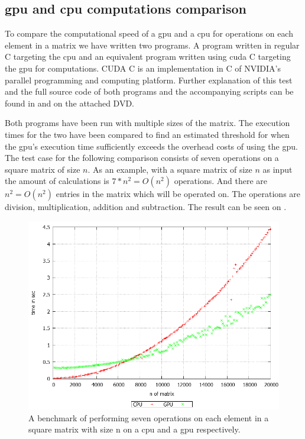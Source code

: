 \subsection{\acrshort{gpu} and \acrshort{cpu} computations comparison}\label{sub:gpubenchmark}
To compare the computational speed of a \acrshort{gpu} and a \acrshort{cpu} for operations on each element in a matrix we have written two programs.
A program written in regular C targeting the \acrshort{cpu} and an equivalent program written using \gls{cuda} C targeting the \acrshort{gpu} for computations.
CUDA C is an implementation in C of NVIDIA's parallel programming and computing platform.
Further explanation of this test and the full source code of both programs and the accompanying scripts can be found in  and on the attached DVD.

Both programs have been run with multiple sizes of the matrix.
The execution times for the two have been compared to find an estimated threshold for when the \acrshort{gpu}'s execution time sufficiently exceeds the overhead costs of using the \acrshort{gpu}.
The test case for the following comparison consists of seven operations on a square matrix of size $n$.
As an example, with a square matrix of size $n$ as input the amount of calculations is $7*n^2 = O(n^2)$ operations. 
And there are $n^2 = O(n^2)$ entries in the matrix which will be operated on.
The operations are division, multiplication, addition and subtraction.
The result can be seen on .
\begin{figure}[h!]
\centering
 \includegraphics[width=1\textwidth]{figures/benchmark.png} %
\caption{A benchmark of performing seven operations on each element in a square matrix with size n on a \acrshort{cpu} and a \acrshort{gpu} respectively.}\label{image:benchmark}
\vspace{-15pt}
\end{figure}

